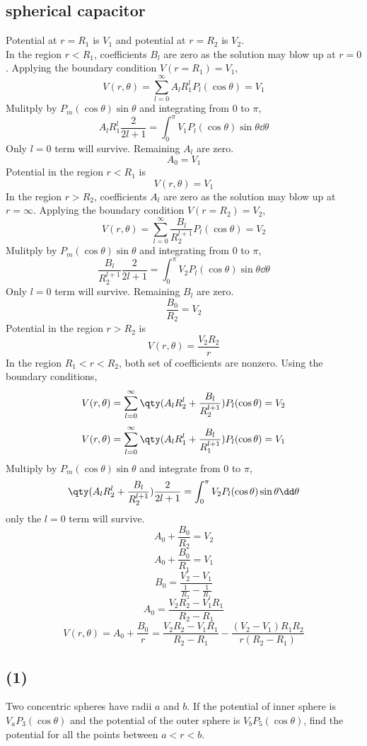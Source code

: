 \subsection*{spherical capacitor}
Potential at $r=R_1$ is $V_1$ and potential at $r=R_2$ is $V_2$.\\
In the region $r<R_1$, coefficients $B_{l}$ are zero as the solution may blow up at $r=0$.
Applying the boundary condition $V(r=R_1)=V_1$,
\[V(r,\theta)=\sum_{l=0}^{\infty}A_{l}R_1^lP_l(\cos\theta)=V_1\]
Mulitply by $P_m(\cos\theta)\sin\theta$ and integrating from $0$ to $\pi$,
\[A_lR_1^l\frac{2}{2l+1}=\int_0^{\pi}V_1P_l(\cos\theta)\sin\theta\dd\theta\]
Only $l=0$ term will survive. Remaining $A_l$ are zero.
\[A_0=V_1\]
Potential in the region $r<R_1$ is \[V(r,\theta)=V_1\]
\newpage
In the region $r>R_2$, coefficients $A_{l}$ are zero as the solution may blow up at $r=\infty$.
Applying the boundary condition $V(r=R_2)=V_2$,
\[V(r,\theta)=\sum_{l=0}^{\infty}\frac{B_{l}}{R_2^{l+1}}P_l(\cos\theta)=V_2\]
Mulitply by $P_m(\cos\theta)\sin\theta$ and integrating from $0$ to $\pi$,
\[\frac{B_l}{R_2^{l+1}}\frac{2}{2l+1}=\int_0^{\pi}V_2P_l(\cos\theta)\sin\theta\dd\theta\]
Only $l=0$ term will survive. Remaining $B_l$ are zero.
\[\frac{B_0}{R_2}=V_2\]
Potential in the region $r>R_2$ is \[V(r,\theta)=\frac{V_2R_2}{r}\]
In the region $R_1<r<R_2$, both set of coefficients are nonzero.
Using the boundary conditions,
\[V(r,\theta)=\sum_{l=0}^{\infty}\qty(A_{l}R_2^l+\frac{B_{l}}{R_2^{l+1}})P_l(\cos\theta)=V_2\]
\[V(r,\theta)=\sum_{l=0}^{\infty}\qty(A_{l}R_1^l+\frac{B_{l}}{R_1^{l+1}})P_l(\cos\theta)=V_1\]
Multiply by $P_m(\cos\theta)\sin\theta$ and integrate from $0$ to $\pi$,
\[\qty(A_{l}R_2^l+\frac{B_{l}}{R_2^{l+1}})\frac{2}{2l+1}=\int_0^{\pi}V_2P_l(\cos\theta)\sin\theta\dd\theta\]
only the $l=0$ term will survive.
\[A_{0}+\frac{B_{0}}{R_2}=V_2\]
\[A_{0}+\frac{B_{0}}{R_1}=V_1\]
\[B_0=\frac{V_2-V_1}{\frac{1}{R_2}-\frac{1}{R_1}}\]
\[A_0=\frac{V_2R_2-V_1R_1}{R_2-R_1}\]
\[V(r,\theta)=A_0+\frac{B_0}{r}=\frac{V_2R_2-V_1R_1}{R_2-R_1}-\frac{(V_2-V_1)R_1R_2}{r(R_2-R_1)}\]
\subsection*{(1)}
Two concentric spheres have radii $a$ and $b$. If the potential of inner sphere is $V_aP_3(\cos\theta)$ and the potential of the outer sphere is $V_bP_5(\cos\theta)$, find the potential for all the points between $a<r<b$.


